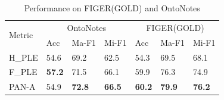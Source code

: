 \documentclass[letterpaper]{article} %
\begin{document}
\vspace{-17pt}
\begin{table}[htbp]
\small
\centering
\caption{Performance on FIGER(GOLD) and OntoNotes}
\label{performancedenoise}
 \begin{tabular}{p{1cm}|p{0.61cm}p{0.87cm}p{0.87cm}|p{0.60cm}p{0.87cm}p{0.87cm}}
\hline
\multirow{2}{*}{Metric} & \multicolumn{3}{c|}{OntoNotes} & \multicolumn{3}{c}{FIGER(GOLD)} \\
  & Acc &  Ma-F1 & Mi-F1 & Acc & Ma-F1 & Mi-F1 \\
\hline
H\_PLE & 54.6 & 69.2 & 62.5 & 54.3 & 69.5 & 68.1 \\
F\_PLE & \textbf{57.2} & 71.5 & 66.1& 59.9 & 76.3 & 74.9 \\
\hline
PAN-A & 54.9 & \textbf{72.8} & \textbf{66.5} & \textbf{60.2} & \textbf{79.9} & \textbf{76.2}  \\
\hline
\end{tabular}
\vspace{-10pt}
\end{table}
\end{document}

